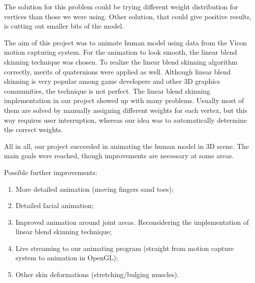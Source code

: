 \documentclass[times, 10pt,twocolumn]{article}
\begin{document}
The solution for this problem could be trying different weight distribution for vertices than those we were using.
Other solution, that could give positive results, is cutting out smaller bits of the model.


 The aim of this project was to animate human model using data from the Vicon motion capturing system. For the animation to look smooth, the linear blend skinning technique was chosen. To realize the linear blend skinning algorithm correctly, merits of quaternions were applied as well. Although linear blend skinning is very popular among game developers and other 3D graphics communities, the technique is not perfect. The linear blend skinning implementation in our project showed up with many problems. Usually most of them are solved by manually assigning different weights for each vertex, but this way requires user interruption, whereas our idea was to automatically determine the correct weights.

 All in all, our project succeeded in animating the human model in 3D scene. The main goals were reached, though improvements are necessary at some areas.

Possible further improvements:
\begin{enumerate}
    \item More detailed animation (moving fingers sand toes);
    \item Detailed facial animation;
    \item Improved animation around joint areas. Reconsidering the implementation of linear blend skinning technique;
    \item Live streaming to our animating program (straight from motion capture system to animation in OpenGL);
    \item Other skin deformations (stretching/bulging muscles).
\end{enumerate}



\nocite{ex1,ex2,ex3,ex4,ex5,ex6,ex7,ex8,ex9,ex10,ex11,ex12,ex13,ex14,ex15,ex16,ex17}


\end{document}
